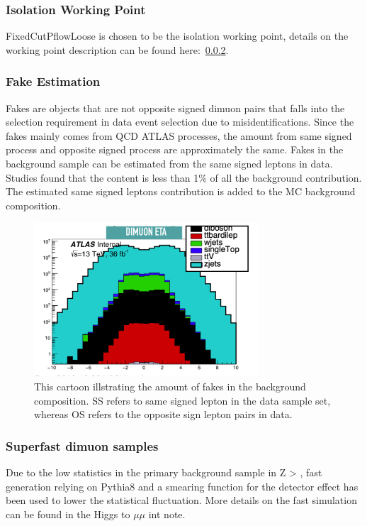 \subsubsection*{Isolation Working Point}
FixedCutPflowLoose is chosen to be the isolation working point, details on the working point description can be found here:~\ref{}. 



\subsubsection{Fake Estimation}
Fakes are objects that are not opposite signed dimuon pairs that falls into the selection requirement in data event selection due to misidentifications.
Since the fakes mainly comes from QCD ATLAS processes, the amount from same signed process and opposite signed process are approximately the same. 
Fakes in the background sample can be estimated from the same signed leptons in data. Studies found that the content is less than 1\% of all the background contribution. The estimated same signed leptons contribution is added to the MC background composition.

\begin{figure}[!htb]
    \begin{center}
        \includegraphics[width=0.75\textwidth]{figures/chapter_dimuon/backgroundcomposition}
        \caption{
        This cartoon illstrating the amount of fakes in the background composition. SS refers to same signed lepton in the data sample set, whereas OS refers to the opposite sign lepton pairs in data. }
    \end{center}
\end{figure}

\subsubsection{Superfast dimuon samples}
Due to the low statistics in the primary background sample in  Z > \mu \mu, fast generation relying on Pythia8 and a smearing function for the detector effect has been used to lower the statistical fluctuation. More details on the fast simulation can be found in the Higgs to $\mu \mu $ int note.

